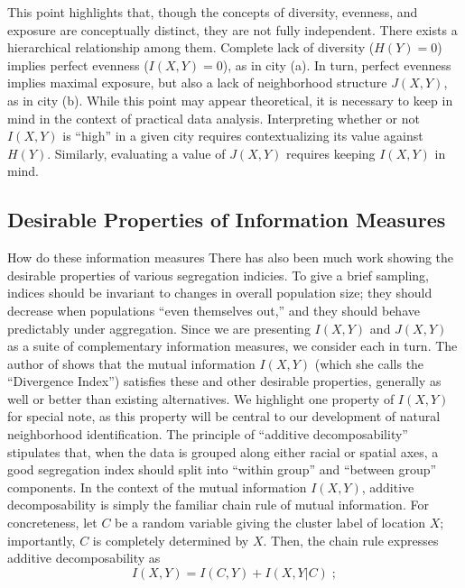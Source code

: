 	This point highlights that, though the concepts of diversity, evenness, and exposure are conceptually distinct, they are not fully independent. There exists a hierarchical relationship among them. Complete lack of diversity ($H(Y) = 0$) implies perfect evenness ($I(X,Y) = 0$), as in city (a). In turn, perfect evenness implies maximal exposure, but also a lack of neighborhood structure $J(X,Y)$, as in city (b). While this point may appear theoretical, it is necessary to keep in mind in the context of practical data analysis. Interpreting whether or not $I(X,Y)$ is ``high'' in a given city requires contextualizing its value against $H(Y)$. Similarly, evaluating a value of $J(X,Y)$ requires keeping $I(X,Y)$ in mind. 

\subsection*{Desirable Properties of Information Measures}
	How do these information measures There has also been much work showing the desirable properties of various segregation indicies. To give a brief sampling, indices should be invariant to changes in overall population size; they should decrease when populations ``even themselves out,'' and they should behave predictably under aggregation. Since we are presenting $I(X,Y)$ and $J(X,Y)$ as a suite of complementary information measures, we consider each in turn. The author of \cite{Roberto2015a} shows that the mutual information $I(X,Y)$ (which she calls the ``Divergence Index'') satisfies these and other desirable properties, generally as well or better than existing alternatives. We highlight one property of $I(X,Y)$ for special note, as this property will be central to our development of natural neighborhood identification. The principle of ``additive decomposability'' \cite{Reardon2002} stipulates that, when the data is grouped along either racial or spatial axes, a good segregation index should split into ``within group'' and ``between group'' components. In the context of the mutual information $I(X,Y)$, additive decomposability is simply the familiar chain rule of mutual information. For concreteness, let $C$ be a random variable giving the cluster label of location $X$; importantly, $C$ is completely determined by $X$. Then, the chain rule expresses additive decomposability as 
	\begin{equation}
		I(X,Y) = I(C,Y) + I(X,Y|C)\;; \label{eq:information_decomp}
	\end{equation}
